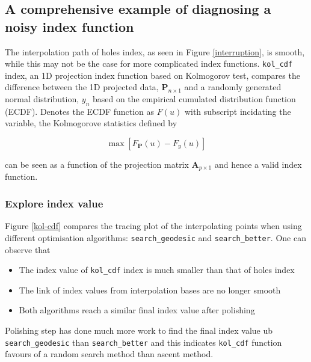 \documentclass[12pt]{article}
\providecommand{\tightlist}{%
  \setlength{\itemsep}{0pt}\setlength{\parskip}{0pt}}
\begin{document}
\newpage

\hypertarget{a-comprehensive-example-of-diagnosing-a-noisy-index-function}{%
\subsection{A comprehensive example of diagnosing a noisy index
function}\label{a-comprehensive-example-of-diagnosing-a-noisy-index-function}}

The interpolation path of holes index, as seen in Figure
\ref{interruption}, is smooth, while this may not be the case for more
complicated index functions. \texttt{kol\_cdf} index, an 1D projection
index function based on Kolmogorov test, compares the difference between
the 1D projected data, \(\mathbf{P}_{n \times 1}\) and a randomly
generated normal distribution, \(y_n\) based on the empirical cumulated
distribution function (ECDF). Denotes the ECDF function as \(F(u)\) with
subscript incidating the variable, the Kolmogorove statistics defined by

\[\max \left[F_{\mathbf{P}}(u) - F_{y}(u)\right]\]

can be seen as a function of the projection matrix
\(\mathbf{A}_{p \times 1}\) and hence a valid index function.

\hypertarget{explore-index-value}{%
\subsubsection{Explore index value}\label{explore-index-value}}

Figure \ref{kol-cdf} compares the tracing plot of the interpolating
points when using different optimisation algorithms:
\texttt{search\_geodesic} and \texttt{search\_better}. One can observe
that

\begin{itemize}
\tightlist
\item
  The index value of \texttt{kol\_cdf} index is much smaller than that
  of holes index
\item
  The link of index values from interpolation bases are no longer smooth
\item
  Both algorithms reach a similar final index value after polishing
\end{itemize}

Polishing step has done much more work to find the final index value ub
\texttt{search\_geodesic} than \texttt{search\_better} and this
indicates \texttt{kol\_cdf} function favours of a random search method
than ascent method.
\end{document}
